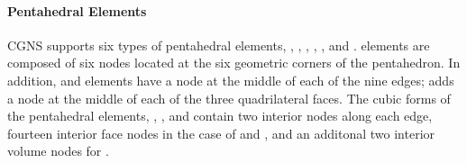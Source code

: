 {{{\paragraph{Pentahedral Elements}
CGNS supports six types of pentahedral elements, ,
, , , , and .
 elements are composed of six nodes located at the
six geometric corners of the pentahedron.
In addition,  and  elements have a node
at the middle of each of the nine edges;  adds a
node at the middle of each of the three quadrilateral faces.
The cubic forms of the pentahedral elements, ,
, and 
contain two interior nodes along each edge, fourteen interior face nodes
in the case of  and , and an additonal
two interior volume nodes for .


}}}
